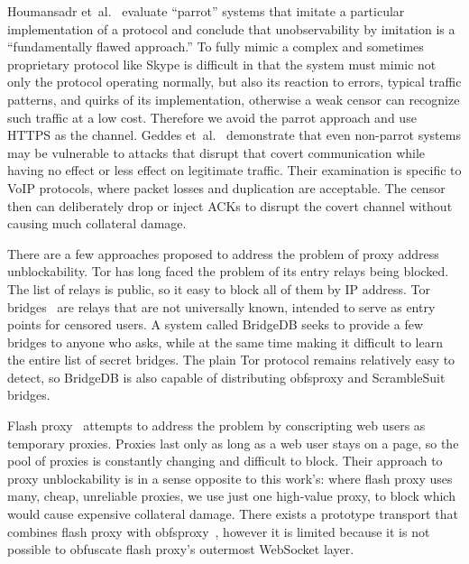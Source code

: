\documentclass{article}
\begin{document}
Houmansadr et~al.~\cite{parrot} evaluate ``parrot'' systems that imitate a particular implementation of a protocol
and conclude that unobservability by imitation is a ``fundamentally
flawed approach.''
To fully mimic a complex and sometimes proprietary protocol like Skype
is difficult in that the system must mimic not only the protocol operating normally, but also its reaction to errors,
typical traffic patterns, and quirks of its implementation,
otherwise a weak censor can recognize such traffic at a low cost.
Therefore we avoid the parrot approach and use HTTPS as the channel. Geddes et~al.~\cite{acks}
demonstrate that even non-parrot systems may be vulnerable to
attacks that disrupt that covert communication while having no effect or less
effect on legitimate traffic. Their examination is specific to VoIP protocols,
where packet losses and duplication are acceptable. The censor then can
deliberately drop or inject ACKs to disrupt the covert channel without causing
much collateral damage.


There are a few approaches proposed to address the problem of proxy address unblockability.
Tor has long faced the problem of its entry relays being blocked. The list of
relays is public, so it easy to block all of them by IP address. Tor
bridges~\cite{tor-blocking} are relays that are not universally known, intended
to serve as entry points for censored users. A system called BridgeDB seeks to
provide a few bridges to anyone who asks, while at the same time making it
difficult to learn the entire list of secret bridges. The plain Tor protocol
remains relatively easy to detect, so BridgeDB is also capable of distributing
obfsproxy and ScrambleSuit bridges.

Flash proxy~\cite{flashproxy} attempts to address the problem  by
conscripting web users as temporary proxies. Proxies last only as long as a web
user stays on a page, so the pool of proxies is constantly changing and
difficult to block. Their approach to proxy unblockability is in a sense
opposite to this work's: where flash proxy uses many, cheap, unreliable proxies,
we use just one high-value proxy, to block which would cause expensive
collateral damage. There exists a prototype transport that combines flash proxy
with obfsproxy~\cite{obfs-flash}, however it is limited because it is not
possible to obfuscate flash proxy's outermost WebSocket layer.
\end{document}
